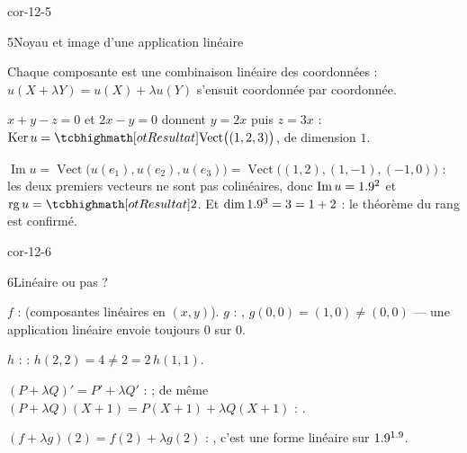 \begin{blocLivre}{cor-12-5}
\begin{corrige}{5}{Noyau et image d'une application linéaire}
\begin{questions}
  \item Chaque composante est une combinaison linéaire des coordonnées :
    $u(X+\lambda Y)=u(X)+\lambda u(Y)$ s'ensuit coordonnée par coordonnée.
  \item $x+y-z=0$ et $2x-y=0$ donnent $y=2x$ puis $z=3x$ :
    $\operatorname{Ker}u=\res{\operatorname{Vect}\bigl((1,2,3)\bigr)}$,
    de dimension $1$.
  \item $\operatorname{Im}u=\operatorname{Vect}\bigl(u(e_1),u(e_2),u(e_3)\bigr)
    =\operatorname{Vect}\bigl((1,2),(1,-1),(-1,0)\bigr)$ : les deux premiers
    vecteurs ne sont pas colinéaires, donc
    $\operatorname{Im}u=1.9^{2}$ et $\operatorname{rg}u=\res{2}$. Et
    $\dim1.9^{3}=3=1+2$ : le théorème du rang est confirmé.
\end{questions}
\end{corrige}
\end{blocLivre}

\begin{blocLivre}{cor-12-6}
\begin{corrige}{6}{Linéaire ou pas ?}
\begin{questions}
  \item $f$ :  (composantes linéaires en $(x,y)$).
    $g$ : , $g(0,0)=(1,0)\neq(0,0)$ — une application
    linéaire envoie toujours $0$ sur $0$.
  \item $h$ :  : $h(2,2)=4\neq2=2\,h(1,1)$.
  \item $(P+\lambda Q)'=P'+\lambda Q'$ :  ; de même
    $(P+\lambda Q)(X+1)=P(X+1)+\lambda Q(X+1)$ : .
  \item $(f+\lambda g)(2)=f(2)+\lambda g(2)$ : , c'est une
    forme linéaire sur $1.9^{1.9}$.
\end{questions}
\end{corrige}
\end{blocLivre}

